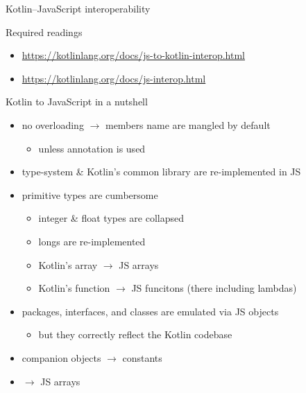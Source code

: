 \documentclass[handout]{beamer}
\begin{document}
\begin{frame}[allowframebreaks]{Kotlin--JavaScript interoperability}
    \begin{alertblock}{Required readings}
        \begin{itemize}
            \item \url{https://kotlinlang.org/docs/js-to-kotlin-interop.html}
            \item \url{https://kotlinlang.org/docs/js-interop.html}
        \end{itemize}
    \end{alertblock}

    \begin{block}{Kotlin to JavaScript in a nutshell}
        \begin{itemize}\small
            \item no overloading $\rightarrow$ members name are mangled\footnotemark{} by default
            \begin{itemize}
                \item unless  annotation is used
            \end{itemize}
            \item type-system \& Kotlin's common library are re-implemented in JS
            \item primitive types are cumbersome
            \begin{itemize}
                \item integer \& float types are collapsed
                \item longs are re-implemented
                \item Kotlin's array $\rightarrow$ JS arrays
                \item Kotlin's function $\rightarrow$ JS funcitons (there including lambdas)
            \end{itemize}
            \item packages, interfaces, and classes are \alert{emulated} via JS objects
            \begin{itemize}
                \item but they correctly reflect the Kotlin codebase
            \end{itemize}
            \item companion objects $\rightarrow$  constants
            \item {} $\rightarrow$ JS arrays
        \end{itemize}
    \end{block}


\end{frame}
\end{document}

